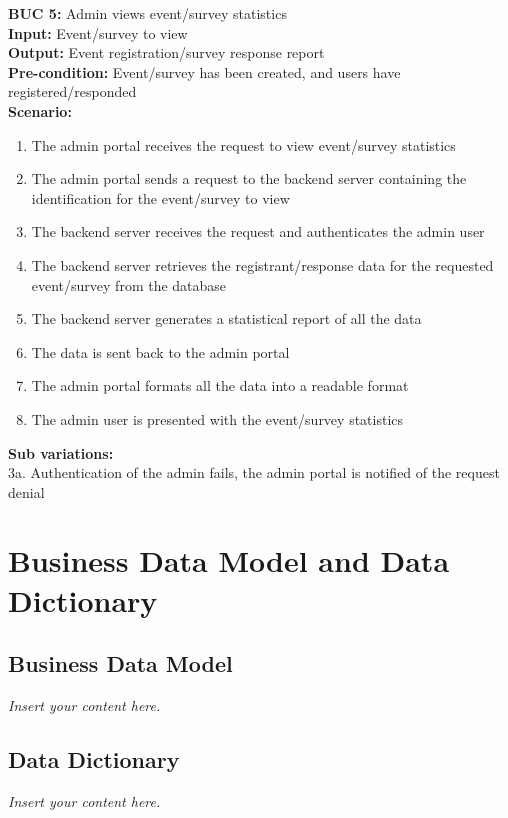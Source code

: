 \documentclass[12pt]{article}
\newcommand{\lips}{\textit{Insert your content here.}}
\begin{document}
\noindent\textbf{BUC 5: } Admin views event/survey statistics \\
\textbf{Input:} Event/survey to view \\
\textbf{Output:} Event registration/survey response report \\
\textbf{Pre-condition:} Event/survey has been created, and users have registered/responded \\
\textbf{Scenario:} \\
\begin{enumerate}
  \item The admin portal receives the request to view event/survey statistics
  \item The admin portal sends a request to the backend server containing the identification for the event/survey to view
  \item The backend server receives the request and authenticates the admin user
  \item The backend server retrieves the registrant/response data for the requested event/survey from the database
  \item The backend server generates a statistical report of all the data
  \item The data is sent back to the admin portal
  \item The admin portal formats all the data into a readable format
  \item The admin user is presented with the event/survey statistics
\end{enumerate}
\textbf{Sub variations:} \\
3a. Authentication of the admin fails, the admin portal is notified of the request denial \\


\section{Business Data Model and Data Dictionary}
\subsection{Business Data Model}
\lips
\subsection{Data Dictionary}
\lips
\end{document}
